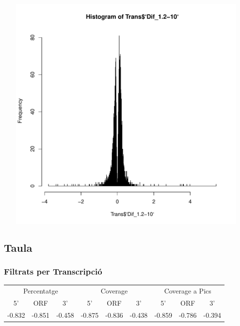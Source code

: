 \documentclass{article}\usepackage[]{graphicx}\usepackage[]{color}
\newenvironment{knitrout}{}{} %
\begin{document}
\clearpage
\begin{knitrout}
\color{fgcolor}

{\centering \includegraphics[width=20cm,height=12cm]{figure/minimal-cor_plots3-1} 

}



\end{knitrout}
\clearpage



\subsection{Taula}
\subsubsection{Filtrats per Transcripció}
\begin{tabular}{ccc|ccc|ccc}
\hline
\multicolumn{3}{c}{Percentatge} &
\multicolumn{3}{c}{Coverage} &
\multicolumn{3}{c}{Coverage a Pics} \\
\cline{1-3}
\cline{4-6}
\cline{7-9}
5' & ORF & 3' & 5' & ORF & 3' & 5' & ORF & 3' \\
\hline
-0.832 & -0.851 & -0.458 &
-0.875 & -0.836 & -0.438 &
-0.859 & -0.786 & -0.394\\
\hline
\end{tabular} \\\\
\end{document}
